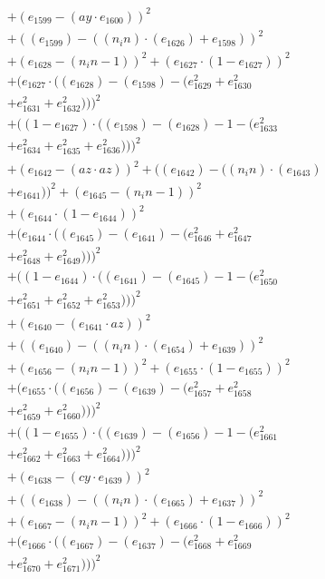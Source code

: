 \documentclass[10pt, a4paper]{article}
\begin{document}
\begin{small}
\begin{align*}
& + (e_{1599} - (ay  \cdot  e_{1600}))^{2} \\
& + ((e_{1599}) - ((n_in)  \cdot  (e_{1626}) + e_{1598}))^{2} \\
& + (e_{1628} - (n_in - 1))^{2} + (e_{1627}  \cdot  (1 - e_{1627}))^{2} \\
& + (e_{1627}  \cdot  ((e_{1628}) - (e_{1598}) - (e_{1629}^{2} + e_{1630}^{2} \\
& + e_{1631}^{2} + e_{1632}^{2})))^{2} \\
& + ((1 - e_{1627})  \cdot  ((e_{1598}) - (e_{1628}) - 1 - (e_{1633}^{2} \\
& + e_{1634}^{2} + e_{1635}^{2} + e_{1636}^{2})))^{2} \\
& + (e_{1642} - (az  \cdot  az))^{2} + ((e_{1642}) - ((n_in)  \cdot  (e_{1643}) \\
& + e_{1641}))^{2} + (e_{1645} - (n_in - 1))^{2} \\
& + (e_{1644}  \cdot  (1 - e_{1644}))^{2} \\
& + (e_{1644}  \cdot  ((e_{1645}) - (e_{1641}) - (e_{1646}^{2} + e_{1647}^{2} \\
& + e_{1648}^{2} + e_{1649}^{2})))^{2} \\
& + ((1 - e_{1644})  \cdot  ((e_{1641}) - (e_{1645}) - 1 - (e_{1650}^{2} \\
& + e_{1651}^{2} + e_{1652}^{2} + e_{1653}^{2})))^{2} \\
& + (e_{1640} - (e_{1641}  \cdot  az))^{2} \\
& + ((e_{1640}) - ((n_in)  \cdot  (e_{1654}) + e_{1639}))^{2} \\
& + (e_{1656} - (n_in - 1))^{2} + (e_{1655}  \cdot  (1 - e_{1655}))^{2} \\
& + (e_{1655}  \cdot  ((e_{1656}) - (e_{1639}) - (e_{1657}^{2} + e_{1658}^{2} \\
& + e_{1659}^{2} + e_{1660}^{2})))^{2} \\
& + ((1 - e_{1655})  \cdot  ((e_{1639}) - (e_{1656}) - 1 - (e_{1661}^{2} \\
& + e_{1662}^{2} + e_{1663}^{2} + e_{1664}^{2})))^{2} \\
& + (e_{1638} - (cy  \cdot  e_{1639}))^{2} \\
& + ((e_{1638}) - ((n_in)  \cdot  (e_{1665}) + e_{1637}))^{2} \\
& + (e_{1667} - (n_in - 1))^{2} + (e_{1666}  \cdot  (1 - e_{1666}))^{2} \\
& + (e_{1666}  \cdot  ((e_{1667}) - (e_{1637}) - (e_{1668}^{2} + e_{1669}^{2} \\
& + e_{1670}^{2} + e_{1671}^{2})))^{2} \\

\end{align*}
\end{small}
\end{document}
